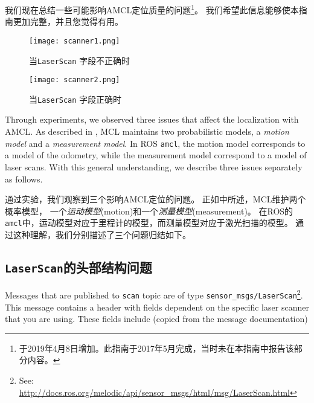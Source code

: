 
我们现在总结一些可能影响AMCL定位质量的问题\footnote{于2019年4月8日增加。此指南于2017年5月完成，当时未在本指南中报告该部分内容。}。 我们希望此信息能够使本指南更加完整，并且您觉得有用。

\begin{figure}[!tb]
	\texttt{[image: scanner1.png]}
	\caption{当\texttt{LaserScan} 字段不正确时}
	\label{fig:scanner1}
	\endminipage\hfill
	\texttt{[image: scanner2.png]}
	\caption{当\texttt{LaserScan} 字段正确时}
	\label{fig:scanner2}
	\endminipage\hfill
\end{figure}

Through experiments, we observed three issues that affect the localization with AMCL. As described in \cite{thrun2005probabilistic}, MCL maintains two probabilistic models, a \emph{motion model} and a \emph{measurement model}. In ROS \texttt{amcl}, the motion model corresponds to a model of the odometry, while the measurement model correspond to a model of laser scans. With this general understanding, we describe three issues separately as follows. 


通过实验，我们观察到三个影响AMCL定位的问题。 正如\cite{thrun2005probabilistic}中所述，MCL维护两个概率模型，
一个\emph{运动模型}(motion)和一个\emph{测量模型}(measurement)。 
在ROS的\texttt{amcl}中，运动模型对应于里程计的模型，而测量模型对应于激光扫描的模型。 
通过这种理解，我们分别描述了三个问题归结如下。

\subsection[Header in \texttt{LaserScan} messages]{\texttt{LaserScan}的头部结构问题}%

Messages that are published to \texttt{scan} topic are of type \texttt{sensor\_msgs/LaserScan}\footnote{See: \url{http://docs.ros.org/melodic/api/sensor_msgs/html/msg/LaserScan.html}}. This message contains a header with fields dependent on the specific laser scanner that you are using. These fields include (copied from the message documentation)

